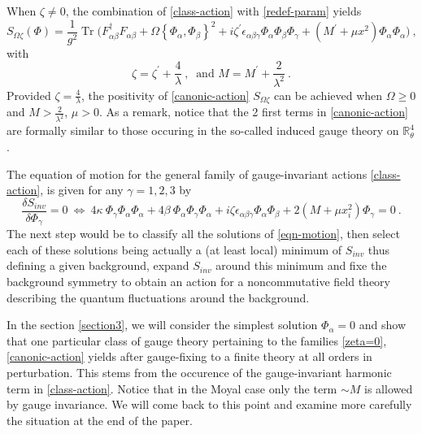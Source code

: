 \documentclass[a4paper,11pt,twoside]{article}
\numberwithin{equation}{section}
\DeclareMathOperator{\tr}{Tr}
\theoremstyle{nonumberplain}
\newcounter{and}
\begin{document}
%
When $\zeta\ne0$, the combination of \eqref{class-action} with \eqref{redef-param} yields%
%
\begin{equation}
S_{\Omega\zeta}(\Phi) = \frac{1}{g^2} \tr\bigg(F^\dag_{\alpha\beta}F_{\alpha\beta} + \Omega\left\{\Phi_\alpha,\Phi_\beta\right\}^2 + i \zeta^\prime\epsilon_{\alpha\beta\gamma} \Phi_\alpha \Phi_\beta \Phi_\gamma + \left(M^\prime+\mu x^2\right) \Phi_\alpha \Phi_\alpha \bigg) \ , \label{canonic-action}
\end{equation}
%
with%
%
\begin{equation}
\zeta = \zeta^\prime+\frac{4}{\lambda} \ , \ \mbox{ and }  M=M^\prime+\frac{2}{\lambda^2} \ . \label{new-param}
\end{equation}
%
Provided $\zeta=\frac{4}{\lambda}$, the positivity of \eqref{canonic-action} $S_{\Omega\zeta}$ can be achieved when $\Omega\ge0$ and $M>\frac{2}{\lambda^2}$, $\mu>0$. As a remark, notice that the 2 first terms in \eqref{canonic-action} are formally similar to those occuring in the so-called induced gauge theory on $\mathbb{R}^4_\theta$ \cite{GWW, GW07}.\par%
%
The equation of motion for the general family of gauge-invariant actions \eqref{class-action}, is given for any $\gamma=1,2,3$ by%
%
\begin{equation}
\frac{\delta S_{inv}}{\delta{\Phi}_\gamma}=0 \ \Longleftrightarrow \ 4\kappa \ \Phi_\gamma \Phi_\alpha \Phi_\alpha + 4 \beta \ \Phi_\alpha \Phi_\gamma \Phi_\alpha + i \zeta \epsilon_{\alpha\beta\gamma} \Phi_\alpha \Phi_\beta + 2(M+\mu x_i^2) \Phi_\gamma = 0 \ . \label{eqn-motion}
\end{equation}
%
The next step would be to classify all the solutions of \eqref{eqn-motion}, then select each of these solutions being actually a (at least local) minimum of $S_{inv}$ thus defining a given background, expand $S_{inv}$ around this minimum and fixe the background symmetry to obtain an action for a noncommutative field theory describing the quantum fluctuations around the background.\par%
%
In the section \ref{section3}, we will consider the simplest solution $\Phi_\alpha=0$ and show that one particular class of gauge theory pertaining to the families \eqref{zeta=0}, \eqref{canonic-action} yields after gauge-fixing to a finite theory at all orders in perturbation. This stems from the occurence of the gauge-invariant harmonic term in \eqref{class-action}. Notice that in the Moyal case only the term $\sim M$ is allowed by gauge invariance. We will come back to this point and examine more carefully the situation at the end of the paper.\par%
\end{document}
